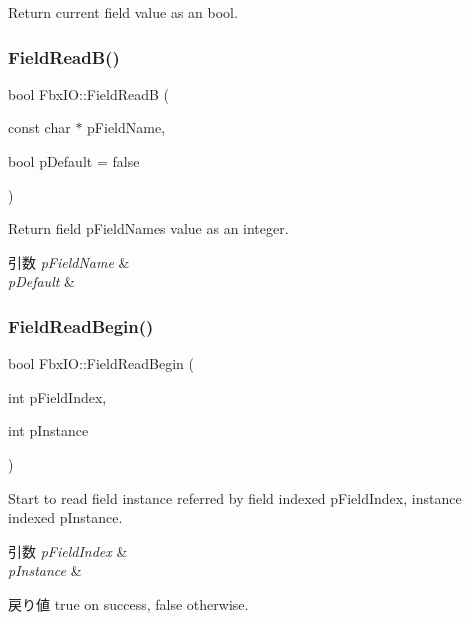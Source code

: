 Return current field value as an bool. 

\mbox{\label{class_fbx_i_o_a19d9535fa286d464a72563e122e626ad}} 
\subsubsection{\texorpdfstring{Field\+Read\+B()}{FieldReadB()}\hspace{0.1cm}{\footnotesize\ttfamily [2/2]}}
{\footnotesize\ttfamily bool Fbx\+I\+O\+::\+Field\+ReadB (\begin{DoxyParamCaption}\item[{const char $\ast$}]{p\+Field\+Name,  }\item[{bool}]{p\+Default = {\ttfamily false} }\end{DoxyParamCaption})}

Return field p\+Field\+Name\textquotesingle{}s value as an integer. 
\begin{DoxyParams}{引数}
{\em p\+Field\+Name} & \\
\hline
{\em p\+Default} & \\
\hline
\end{DoxyParams}
\mbox{\label{class_fbx_i_o_a0e7e1a7e91b4f5ae33e4bcf93cf315cf}} 
\subsubsection{\texorpdfstring{Field\+Read\+Begin()}{FieldReadBegin()}\hspace{0.1cm}{\footnotesize\ttfamily [1/3]}}
{\footnotesize\ttfamily bool Fbx\+I\+O\+::\+Field\+Read\+Begin (\begin{DoxyParamCaption}\item[{int}]{p\+Field\+Index,  }\item[{int}]{p\+Instance }\end{DoxyParamCaption})}

Start to read field instance referred by field indexed p\+Field\+Index, instance indexed p\+Instance. 
\begin{DoxyParams}{引数}
{\em p\+Field\+Index} & \\
\hline
{\em p\+Instance} & \\
\hline
\end{DoxyParams}
\begin{DoxyReturn}{戻り値}
{\ttfamily true} on success, {\ttfamily false} otherwise. 
\end{DoxyReturn}
\mbox{\label{class_fbx_i_o_af40603ed3c18987812af2ac379f977b7}} 

